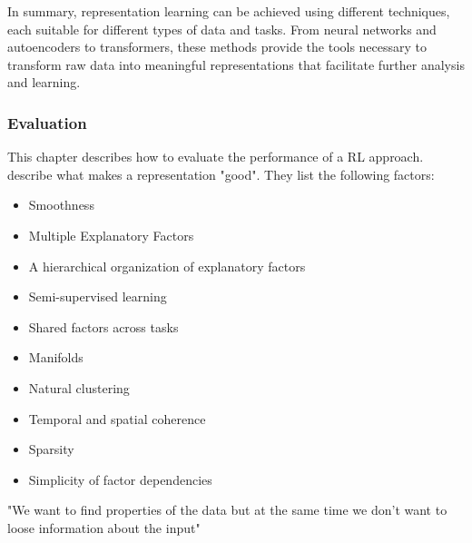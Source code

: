 In summary, representation learning can be achieved using different techniques, each suitable for different types of data and tasks. From neural networks and autoencoders to transformers, these methods provide the tools necessary to transform raw data into meaningful representations that facilitate further analysis and learning.
\subsubsection{Evaluation}\label{theory:evaluation}
This chapter describes how to evaluate the performance of a RL approach.
 describe what makes a representation "good". They list the following factors:
\begin{itemize}
  \item Smoothness
  \item Multiple Explanatory Factors
  \item A hierarchical organization of explanatory factors
  \item Semi-supervised learning
  \item Shared factors across tasks
  \item Manifolds
  \item Natural clustering
  \item Temporal and spatial coherence
  \item Sparsity
  \item Simplicity of factor dependencies
\end{itemize}
"We want to find properties of the data but at the same time we don't want to loose information about the input" \cite[S. 525]{goodfellow_deep_2016}
